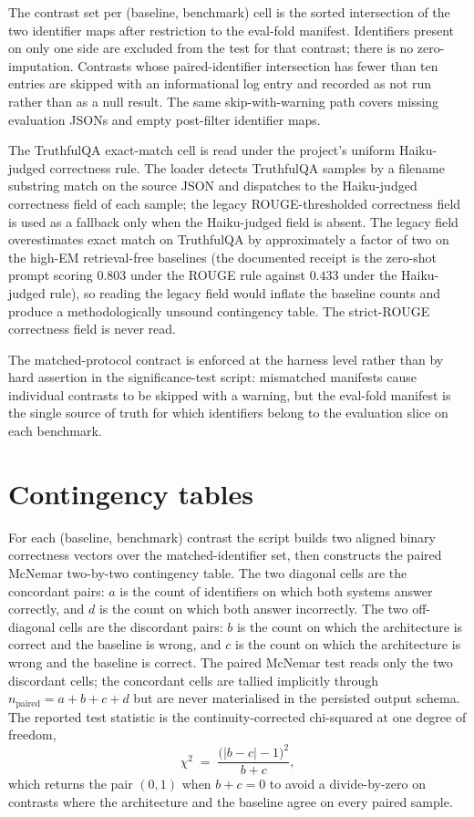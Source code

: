 The contrast set per (baseline, benchmark) cell is the sorted intersection of the two identifier maps after restriction to the eval-fold manifest. Identifiers present on only one side are excluded from the test for that contrast; there is no zero-imputation. Contrasts whose paired-identifier intersection has fewer than ten entries are skipped with an informational log entry and recorded as not run rather than as a null result. The same skip-with-warning path covers missing evaluation JSONs and empty post-filter identifier maps.

The TruthfulQA exact-match cell is read under the project's uniform Haiku-judged correctness rule. The loader detects TruthfulQA samples by a filename substring match on the source JSON and dispatches to the Haiku-judged correctness field of each sample; the legacy ROUGE-thresholded correctness field is used as a fallback only when the Haiku-judged field is absent. The legacy field overestimates exact match on TruthfulQA by approximately a factor of two on the high-EM retrieval-free baselines (the documented receipt is the zero-shot prompt scoring $0.803$ under the ROUGE rule against $0.433$ under the Haiku-judged rule), so reading the legacy field would inflate the baseline counts and produce a methodologically unsound contingency table. The strict-ROUGE correctness field is never read.

The matched-protocol contract is enforced at the harness level rather than by hard assertion in the significance-test script: mismatched manifests cause individual contrasts to be skipped with a warning, but the eval-fold manifest is the single source of truth for which identifiers belong to the evaluation slice on each benchmark.

\section{Contingency tables}
\label{app:sig-tables}

For each (baseline, benchmark) contrast the script builds two aligned binary correctness vectors over the matched-identifier set, then constructs the paired McNemar two-by-two contingency table. The two diagonal cells are the concordant pairs: $a$ is the count of identifiers on which both systems answer correctly, and $d$ is the count on which both answer incorrectly. The two off-diagonal cells are the discordant pairs: $b$ is the count on which the architecture is correct and the baseline is wrong, and $c$ is the count on which the architecture is wrong and the baseline is correct. The paired McNemar test reads only the two discordant cells; the concordant cells are tallied implicitly through $n_{\text{paired}} = a + b + c + d$ but are never materialised in the persisted output schema. The reported test statistic is the continuity-corrected chi-squared at one degree of freedom,
\[
\chi^{2} \;=\; \frac{\bigl(\lvert b - c \rvert - 1\bigr)^{2}}{b + c},
\]
which returns the pair $(0, 1)$ when $b + c = 0$ to avoid a divide-by-zero on contrasts where the architecture and the baseline agree on every paired sample.


